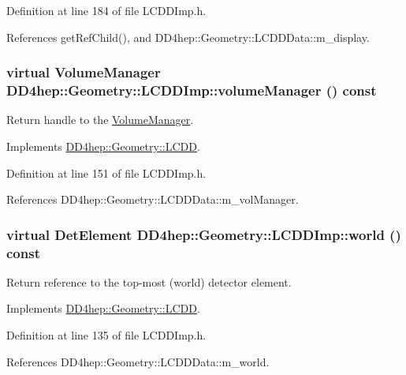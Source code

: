 Definition at line 184 of file LCDDImp.h.

References getRefChild(), and DD4hep::Geometry::LCDDData::m\_\-display.\hypertarget{class_d_d4hep_1_1_geometry_1_1_l_c_d_d_imp_a43a6947e79f1d935cae13ffa14dec807}{
\subsubsection[{volumeManager}]{\setlength{\rightskip}{0pt plus 5cm}virtual {\bf VolumeManager} DD4hep::Geometry::LCDDImp::volumeManager () const}}
\label{class_d_d4hep_1_1_geometry_1_1_l_c_d_d_imp_a43a6947e79f1d935cae13ffa14dec807}


Return handle to the \hyperlink{class_d_d4hep_1_1_geometry_1_1_volume_manager}{VolumeManager}. 

Implements \hyperlink{class_d_d4hep_1_1_geometry_1_1_l_c_d_d_a2112b2267f5f07ecc94e909d696ffdbd}{DD4hep::Geometry::LCDD}.

Definition at line 151 of file LCDDImp.h.

References DD4hep::Geometry::LCDDData::m\_\-volManager.\hypertarget{class_d_d4hep_1_1_geometry_1_1_l_c_d_d_imp_a8aeb5997ee6b66d4207ccab82c2bf8f1}{
\subsubsection[{world}]{\setlength{\rightskip}{0pt plus 5cm}virtual {\bf DetElement} DD4hep::Geometry::LCDDImp::world () const}}
\label{class_d_d4hep_1_1_geometry_1_1_l_c_d_d_imp_a8aeb5997ee6b66d4207ccab82c2bf8f1}


Return reference to the top-\/most (world) detector element. 

Implements \hyperlink{class_d_d4hep_1_1_geometry_1_1_l_c_d_d_ae61d027023791272cf976432c0b3a977}{DD4hep::Geometry::LCDD}.

Definition at line 135 of file LCDDImp.h.

References DD4hep::Geometry::LCDDData::m\_\-world.

